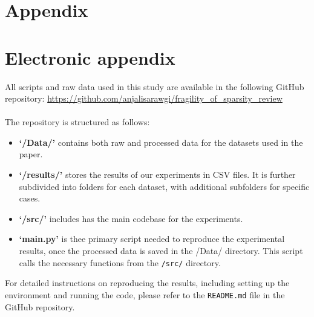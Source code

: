 \newpage

    

\setcounter{page}{5} %

\appendix

\section{Appendix}
\label{app}

\newpage

\section{Electronic appendix}
\label{el_app}

All scripts and raw data used in this study are available in the following GitHub repository: \href{https://github.com/anjalisarawgi/fragility_of_sparsity_review}{https://github.com/anjalisarawgi/fragility\_of\_sparsity\_review}\\
\\
The repository is structured as follows:
\begin{itemize}
    \item \textbf{`/Data/'} contains both raw and processed data for the datasets used in the paper. 
    \item \textbf{`/results/'} stores the results of our experiments in CSV files. It is further subdivided into folders for each dataset, with additional subfolders for specific cases.
    \item \textbf{`/src/'} includes has the main codebase for the experiments. 
    \item \textbf{`main.py'} is thee primary script needed to reproduce the experimental results, once the processed data is saved in the /Data/ directory. This script calls the necessary functions from the \texttt{/src/} directory.
\end{itemize}
For detailed instructions on reproducing the results, including setting up the environment and running the code, please refer to the \texttt{README.md} file in the GitHub repository.
\newpage
    

